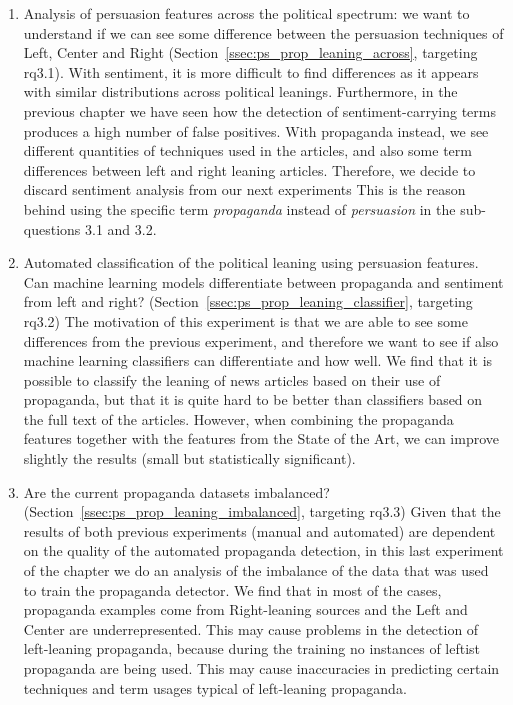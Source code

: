 \begin{enumerate}
    \item Analysis of persuasion features across the political spectrum: we want to understand if we can see some difference between the persuasion techniques of Left, Center and Right (Section~\ref{ssec:ps_prop_leaning_across}, targeting \acrshort{rq}3.1).
    With sentiment, it is more difficult to find differences as it appears with similar distributions across political leanings.
    Furthermore, in the previous chapter we have seen how the detection of sentiment-carrying terms produces a high number of false positives.
    With propaganda instead, we see different quantities of techniques used in the articles, and also some term differences between left and right leaning articles.
    Therefore, we decide to discard sentiment analysis from our next experiments
    This is the reason behind using the specific term \emph{propaganda} instead of \emph{persuasion} in the sub-questions 3.1 and 3.2. 
    \item Automated classification of the political leaning using persuasion features. Can machine learning models differentiate between propaganda and sentiment from left and right? (Section~\ref{ssec:ps_prop_leaning_classifier}, targeting \acrshort{rq}3.2) The motivation of this experiment is that we are able to see some differences from the previous experiment, and therefore we want to see if also machine learning classifiers can differentiate and how well. We find that it is possible to classify the leaning of news articles based on their use of propaganda, but that it is quite hard to be better than classifiers based on the full text of the articles.
    However, when combining the propaganda features together with the features from the State of the Art, we can improve slightly the results (small but statistically significant).
    \item Are the current propaganda datasets imbalanced? (Section~\ref{ssec:ps_prop_leaning_imbalanced}, targeting \acrshort{rq}3.3) Given that the results of both previous experiments (manual and automated) are dependent on the quality of the automated propaganda detection, in this last experiment of the chapter we do an analysis of the imbalance of the data that was used to train the propaganda detector.
    We find that in most of the cases, propaganda examples come from Right-leaning sources and the Left and Center are underrepresented.
    This may cause problems in the detection of left-leaning propaganda, because during the training no instances of leftist propaganda are being used.
    This may cause inaccuracies in predicting certain techniques and term usages typical of left-leaning propaganda.
\end{enumerate}






